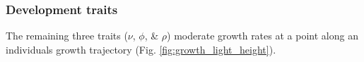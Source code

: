 \documentclass[a4paper,11pt]{article}
\begin{document}
\subsubsection{Development traits}

The remaining three traits ($\nu$, $\phi$, \& $\rho$) moderate growth rates at a point along an individuals growth trajectory (Fig. \ref{fig:growth_light_height}).


\end{document}

